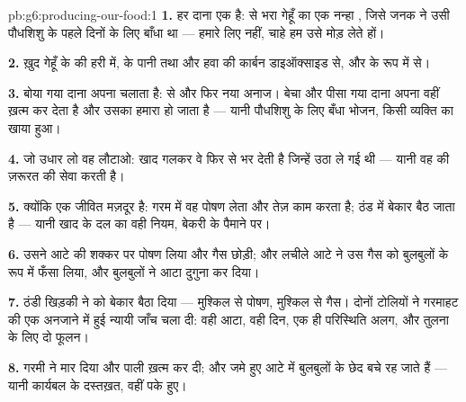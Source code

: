 \begin{solution}{pb:g6:producing-our-food:1}
\textbf{1.} हर दाना एक  है:  से भरा गेहूँ का एक नन्हा
, जिसे जनक ने उसी पौधशिशु के पहले दिनों के लिए बाँधा था --- हमारे
लिए नहीं, चाहे हम उसे मोड़ लेते हों।

\textbf{2.} ख़ुद गेहूँ के  की हरी  में,  के पानी तथा
 और हवा की कार्बन डाइऑक्साइड से, और  के रूप में 
से।

\textbf{3.} बोया गया दाना अपना  चलाता है:  से  और
फिर नया अनाज। बेचा और पीसा गया दाना अपना  वहीं ख़त्म कर देता
है और उसका  हमारा हो जाता है --- यानी पौधशिशु के लिए बँधा
भोजन, किसी व्यक्ति का खाया हुआ।

\textbf{4.} जो उधार लो वह लौटाओ: खाद गलकर वे  फिर से भर देती है
जिन्हें  उठा ले गई थी --- यानी वह  की ज़रूरत की सेवा करती
है।

\textbf{5.} क्योंकि  एक जीवित मज़दूर है: गरम में वह पोषण लेता और
तेज़ काम करता है; ठंड में बेकार बैठ जाता है --- यानी खाद के दल का वही
नियम, बेकरी के पैमाने पर।

\textbf{6.} उसने आटे की शक्कर पर पोषण लिया और गैस छोड़ी; और लचीले आटे
ने उस गैस को बुलबुलों के रूप में फँसा लिया, और बुलबुलों ने आटा दुगुना
कर दिया।

\textbf{7.} ठंडी खिड़की ने  को बेकार बैठा दिया --- मुश्किल से पोषण,
मुश्किल से गैस। दोनों टोलियों ने गरमाहट की एक अनजाने में हुई न्यायी
जाँच चला दी: वही आटा, वही दिन, एक ही परिस्थिति अलग, और तुलना के लिए दो
फूलन।

\textbf{8.} गरमी ने  मार दिया और पाली ख़त्म कर दी; और जमे हुए आटे
में बुलबुलों के छेद बचे रह जाते हैं --- यानी कार्यबल के दस्तख़त, वहीं
पके हुए।


\end{solution}
